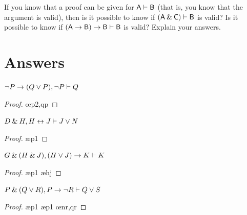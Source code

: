 \problempart
If you know that a proof can be given for $\mathsf{A}\vdash\mathsf{B}$ (that is, you know that the argument is valid), then is it possible to know if $(\mathsf{A} \mathbin{\&} \mathsf{C}) \vdash \mathsf{B}$ is valid? Is it possible to know if $(\mathsf{A} \rightarrow \mathsf{B}) \rightarrow \mathsf{B} \vdash \mathsf{B}$ is valid? Explain your answers.



\section{Answers}
\setcounter{ProbPart}{0}

\problempart
\begin{earg}
\item ${\neg} P \rightarrow (Q \vee P), {\neg} P \vdash Q$
\begin{proof}
	 \pr{}
	 \pr{}
	 
	 \oe{p2,qp}
\end{proof}
\medskip

\item $D \mathbin{\&} H, H \leftrightarrow J  \vdash J \vee N$ 
\begin{proof}
	 \pr{}
	 \pr{}
	 \ae{p1}
	 
	 
\end{proof}
\medskip

\filbreak
\item $G \mathbin{\&} (H \mathbin{\&} J), (H \vee J) \rightarrow K \vdash K$
\begin{proof}
	 \pr{}
	 \pr{}
	 \ae{p1}
	 \ae{hj}
	 
	 
\end{proof}
\medskip


\item $P \mathbin{\&} (Q \vee R), P \rightarrow {\neg} R \vdash Q \vee S$
\begin{proof}
	 \pr{}
	 \pr{}
	 \ae{p1}
	 
	 \ae{p1}
	 \oe{nr,qr}
	 
\end{proof}
\medskip
\end{earg}

